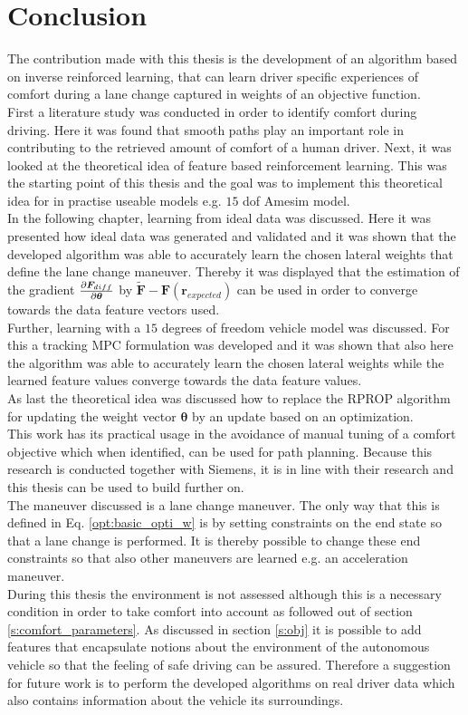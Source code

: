 \chapter{Conclusion}
\label{cha:conclusion}
The contribution made with this thesis is the development of an algorithm based on inverse reinforced learning, that can learn driver specific experiences of comfort during a lane change captured in weights of an objective function.\\
First a literature study was conducted in order to identify comfort during driving. Here it was found that smooth paths play an important role in contributing to the retrieved amount of comfort of a human driver. Next, it was looked at the theoretical idea of feature based reinforcement learning. This was the starting point of this thesis and the goal was to implement this theoretical idea for in practise useable models e.g. $15$ dof Amesim model.\\
In the following chapter, learning from ideal data was discussed. Here it was presented how ideal data was generated and validated and it was shown that the developed algorithm was able to accurately learn the chosen lateral weights that define the lane change maneuver. Thereby it was displayed that the estimation of the gradient $\pdv{\bm{F}_{diff}}{\bm{\theta}}$ by $ \bm{\tilde{F}} - \bm{F}(\bm{r}_{expected})$ can be used in order to converge towards the data feature vectors used.\\
Further, learning with a $15$ degrees of freedom vehicle model was discussed. For this a tracking MPC formulation was developed and it was shown that also here 
the algorithm was able to accurately learn the chosen lateral weights while the learned feature values converge towards the data feature values.\\
As last the theoretical idea was discussed how to replace the RPROP algorithm for updating the weight vector $\bm{\theta}$ by an update based on an optimization. \\

This work has its practical usage in the avoidance of manual tuning of a comfort objective which when identified, can be used for path planning. Because this research is conducted together with Siemens, it is in line with their research and this thesis can be used to build further on.\\
The maneuver discussed is a lane change maneuver. The only way that this is defined in Eq. \ref{opt:basic_opti_w} is by setting constraints on the end state so that a lane change is performed. It is thereby possible to change these end constraints so that also other maneuvers are learned e.g. an acceleration maneuver.\\
During this thesis the environment is not assessed although this is a necessary condition in order to take comfort into account as followed out of section \ref{s:comfort_parameters}. As discussed in section \ref{s:obj} it is possible to add features that encapsulate notions about the environment of the autonomous vehicle so that the feeling of safe driving can be assured. Therefore a suggestion for future work is to perform the developed algorithms on real driver data which also contains information about the vehicle its surroundings.

